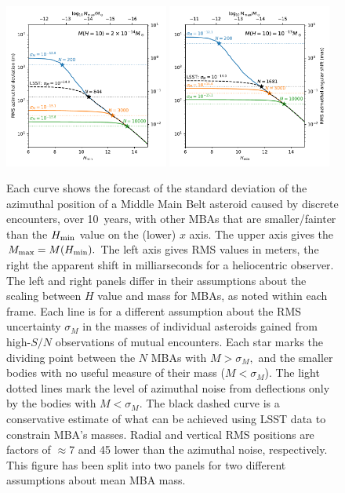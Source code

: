 \documentclass[linenumbers, onecolumn]{aastex631}
\newcommand\edited[1]{{\color{red} {#1}}}
\begin{document}
\begin{figure}
  \centering
  \includegraphics[width=0.48\textwidth]{result_loML.pdf}
  \includegraphics[width=0.48\textwidth]{result_hiML.pdf}
  \caption{Each curve shows the forecast of the standard deviation of the
    azimuthal position of a Middle Main Belt asteroid \edited{caused by discrete
    encounters, over 10~years, with other MBAs that are smaller/fainter than the
    $H_{\rm min}$ value on the (lower) $x$ axis.  The upper axis gives the $M_{\rm max}=M(H_{\rm min}).$}
The left axis gives RMS values in meters, the right
the apparent shift in milliarseconds for a heliocentric observer.
\edited{The left and right panels differ in their assumptions about the scaling between $H$ value and mass for MBAs, as noted within each frame.}
    Each line is for a different assumption about the RMS uncertainty $\sigma_M$ in the masses of individual asteroids gained from high-$S/N$ observations of mutual encounters.
Each star marks the dividing point between the $N$ MBAs with $M>\sigma_M,$ and
the smaller bodies with no useful measure of their mass ($M<\sigma_M$). The
light dotted lines mark the level of azimuthal noise from deflections only by
the bodies with $M<\sigma_M.$ 
The black dashed curve is a conservative estimate of what can be achieved using LSST data to constrain MBA's masses. Radial and vertical RMS positions are factors of $\approx 7$ and 45 lower than the azimuthal noise, respectively. \edited{This figure has been split into two panels for two different assumptions about mean MBA mass.}}
  \label{fig:result}
\end{figure}
\end{document}
